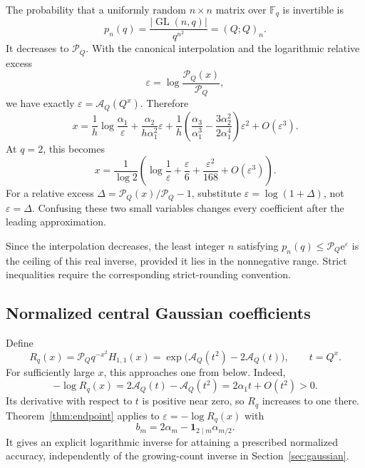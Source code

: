 \documentclass[11pt]{article}
\numberwithin{equation}{section}
\theoremstyle{definition}
\newcommand{\F}{\mathbb F}
\newcommand{\GL}{\operatorname{GL}}
\newcommand{\pp}[1]{(Q;Q)_{#1}}
\newcommand{\Pinf}{\mathcal P_Q}
\newcommand{\A}{\mathcal A_Q}
\newcommand{\ee}{\mathrm e}
\newcommand{\eps}{\varepsilon}
\newcommand{\one}{\mathbf 1}
\begin{document}
The probability that a uniformly random $n\times n$ matrix over $\F_q$ is invertible is
\begin{equation}\label{eq:probability}
 p_n(q)=\frac{|\GL(n,q)|}{q^{n^2}}=\pp{n}.
\end{equation}
It decreases to $\Pinf$. With the canonical interpolation and the logarithmic relative excess
\begin{equation}\label{eq:probability-eps}
 \eps=\log\frac{\mathcal P_Q(x)}{\Pinf},
\end{equation}
we have exactly $\eps=\A(Q^x)$. Therefore
\begin{equation}\label{eq:probability-inverse}
 x=\frac1h\log\frac{\alpha_1}{\eps}
 +\frac{\alpha_2}{h\alpha_1^2}\eps
 +\frac1h\left(\frac{\alpha_3}{\alpha_1^3}
       -\frac{3\alpha_2^2}{2\alpha_1^4}\right)\eps^2
 +O(\eps^3).
\end{equation}
At $q=2$, this becomes
\begin{equation}\label{eq:probability-q2}
 x=\frac1{\log2}\left(
       \log\frac1\eps+\frac\eps6+\frac{\eps^2}{168}
       +O(\eps^3)\right).
\end{equation}
For a relative excess $\Delta=\mathcal P_Q(x)/\Pinf-1$, substitute
$\eps=\log(1+\Delta)$, not $\eps=\Delta$. Confusing these two small variables changes every coefficient after the leading approximation.

Since the interpolation decreases, the least integer $n$ satisfying
$p_n(q)\le\Pinf\ee^{\eps}$ is the ceiling of this real inverse, provided it lies in the nonnegative range. Strict inequalities require the corresponding strict-rounding convention.

\subsection{Normalized central Gaussian coefficients}

Define
\begin{equation}\label{eq:central-normalized}
 R_q(x)=\Pinf q^{-x^2}H_{1,1}(x)
       =\exp\bigl(\A(t^2)-2\A(t)\bigr),\qquad t=Q^x.
\end{equation}
For sufficiently large $x$, this approaches one from below. Indeed,
\[
 -\log R_q(x)=2\A(t)-\A(t^2)=2\alpha_1t+O(t^2)>0.
\]
Its derivative with respect to $t$ is positive near zero, so $R_q$ increases to one there. Theorem~\ref{thm:endpoint} applies to
$\eps=-\log R_q(x)$ with
\begin{equation}\label{eq:central-endpoint-b}
 b_m=2\alpha_m-\one_{2\mid m}\alpha_{m/2}.
\end{equation}
It gives an explicit logarithmic inverse for attaining a prescribed normalized accuracy, independently of the growing-count inverse in Section~\ref{sec:gaussian}.
\end{document}
